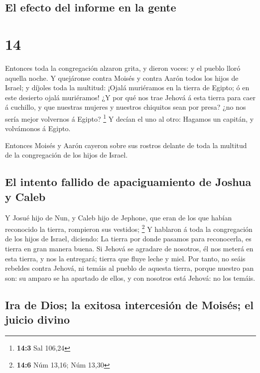 \hypertarget{el-efecto-del-informe-en-la-gente}{%
\subsection{El efecto del informe en la
gente}\label{el-efecto-del-informe-en-la-gente}}

\hypertarget{section-13}{%
\section{14}\label{section-13}}

 Entonces toda la congregación alzaron grita, y dieron
voces: y el pueblo lloró aquella noche.  Y quejáronse
contra Moisés y contra Aarón todos los hijos de Israel; y díjoles toda
la multitud: ¡Ojalá muriéramos en la tierra de Egipto; ó en este
desierto ojalá muriéramos!  ¿Y por qué nos trae Jehová á
esta tierra para caer á cuchillo, y que nuestras mujeres y nuestros
chiquitos sean por presa? ¿no nos sería mejor volvernos á Egipto?
\footnote{\textbf{14:3} Sal 106,24}  Y decían el uno al
otro: Hagamos un capitán, y volvámonos á Egipto.

 Entonces Moisés y Aarón cayeron sobre sus rostros delante
de toda la multitud de la congregación de los hijos de Israel.

\hypertarget{el-intento-fallido-de-apaciguamiento-de-joshua-y-caleb}{%
\subsection{El intento fallido de apaciguamiento de Joshua y
Caleb}\label{el-intento-fallido-de-apaciguamiento-de-joshua-y-caleb}}

 Y Josué hijo de Nun, y Caleb hijo de Jephone, que eran de
los que habían reconocido la tierra, rompieron sus vestidos; \footnote{\textbf{14:6}
  Núm 13,16; Núm 13,30}  Y hablaron á toda la congregación
de los hijos de Israel, diciendo: La tierra por donde pasamos para
reconocerla, es tierra en gran manera buena.  Si Jehová se
agradare de nosotros, él nos meterá en esta tierra, y nos la entregará;
tierra que fluye leche y miel.  Por tanto, no seáis
rebeldes contra Jehová, ni temáis al pueblo de aquesta tierra, porque
nuestro pan son: su amparo se ha apartado de ellos, y con nosotros está
Jehová: no los temáis.

\hypertarget{ira-de-dios-la-exitosa-intercesiuxf3n-de-moisuxe9s-el-juicio-divino}{%
\subsection{Ira de Dios; la exitosa intercesión de Moisés; el juicio
divino}\label{ira-de-dios-la-exitosa-intercesiuxf3n-de-moisuxe9s-el-juicio-divino}}

